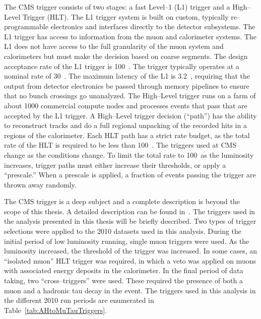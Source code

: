 The CMS trigger consists of two stages: a fast Level--1 (L1) trigger and a
High--Level Trigger (HLT).  The L1 trigger system is built on custom, typically
re--programmable electronics and interfaces directly to the detector subsystems.
The L1 trigger has access to information from the muon and calorimeter systems.
The L1 does not have access to the full granularity of the muon system and
calorimeters but must make the decision based on coarse segments.  The design
acceptance rate of the L1 trigger is 100~\kilo\hertz.  The trigger typically
operates at a nominal rate of 30~\kilo\hertz.  The maximum latency of the L1 is
3.2~\micro\second, requiring that the output from detector electronics be passed
through memory pipelines to ensure that no bunch crossings go unanalyzed.  The
High--Level trigger runs on a farm of about 1000 commercial compute nodes and
processes events that pass that are accepted by the L1 trigger.  A High--Level
trigger decision (``path'') has the ability to reconstruct tracks and do a full
regional unpacking of the recorded hits in a regions of the calorimeter.  Each
HLT path has a strict rate budget, as the total rate of the HLT is required to
be less than 100~\hertz.  The triggers used at CMS change as the conditions
change.  To limit the total rate to 100~\hertz as the luminosity increases,
trigger paths must either increase their thresholds, or apply a ``prescale.''
When a prescale is applied, a fraction of events passing the trigger are thrown
away randomly.

The CMS trigger is a deep subject and a complete description is beyond the scope
of this thesis.  A detailed description can be found in~\cite{CMS-PTDRI}. The
triggers used in the analysis presented in this thesis will be briefly
described.  Two types of trigger selections were applied to the 2010 datasets
used in this analysis.  During the initial period of low luminosity running,
single muon triggers were used.  As the luminosity increased, the \pt threshold
of the trigger was increased.  In some cases, an ``isolated muon'' HLT trigger
was required, in which a veto was applied on muons with associated energy
deposits in the calorimeter.  In the final period of data taking, two
``cross--triggers'' were used.  These required the presence of both a muon and a
hadronic tau decay in the event.  The triggers used in this analysis in the
different 2010 run periods are enumerated in Table~\ref{tab:AHtoMuTauTriggers}.

